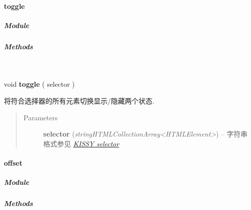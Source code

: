 \documentclass[letterpaper,10pt,english]{sphinxmanual}
\begin{document}
\paragraph{toggle}
\label{api/core/dom/toggle:toggle}\label{api/core/dom/toggle::doc}

\subparagraph{Module}
\label{api/core/dom/toggle:module}\begin{quote}

{\hyperref[api/core/dom/index:module-DOM]{}}
\end{quote}


\subparagraph{Methods}
\label{api/core/dom/toggle:methods}

\begin{fulllineitems}
\label{api/core/dom/toggle:DOM.toggle}~
\begin{DUlineblock}{0em}
\item[] void \textbf{toggle} ( selector )
\item[] 将符合选择器的所有元素切换显示/隐藏两个状态.
\end{DUlineblock}
\begin{quote}\begin{description}
\item[{Parameters}] \leavevmode
\textbf{selector} (\emph{string\textbar{}HTMLCollection\textbar{}Array\textless{}HTMLElement\textgreater{}}) -- 字符串格式参见 {\hyperref[api/core/dom/selector:dom-selector]{\emph{KISSY selector}}}

\end{description}\end{quote}

\end{fulllineitems}



\paragraph{offset}
\label{api/core/dom/offset::doc}\label{api/core/dom/offset:offset}

\subparagraph{Module}
\label{api/core/dom/offset:module}\begin{quote}

{\hyperref[api/core/dom/index:module-DOM]{}}
\end{quote}


\subparagraph{Methods}
\label{api/core/dom/offset:methods}
\end{document}
